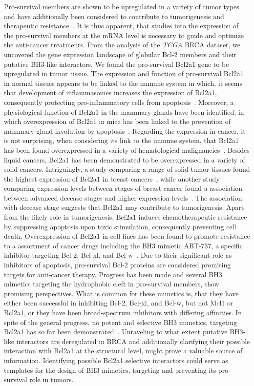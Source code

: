\documentclass[10pt,letterpaper]{article}
\begin{document}
Pro-survival members are shown to be upregulated in a variety of tumor types~\cite{Rochaix1999, Strik1999, 10.2307/1693640, Placzek2010} and have additionally been considered to contribute to tumorigenesis and therapeutic resistance~\cite{Bae2006, Adams2007, Kim2012}. It is thus apparent, that studies into the expression of the pro-survival members at the mRNA level is necessary to guide and optimize the anti-cancer treatments.
From the analysis of the \textit{TCGA} BRCA dataset, we uncovered the gene expression landscape of globular Bcl-2 members and their putative BH3-like interactors.
We found the pro-survival Bcl2a1 gene to be upregulated in tumor tissue. The expression and function of pro-survival Bcl2a1 in normal tissues appears to be linked to the immune system in which, it seems that development of inflammasomes increases the expression of Bcl2a1, consequently protecting pro-inflammatory cells from apoptosis~\cite{Karsan1996, Noble1999}. Moreover, a physiological function of Bcl2a1 in the mammary glands have been identified, in which overexpression of Bcl2a1 in mice has been linked to the prevention of mammary gland involution by apoptosis~\cite{Capuco2002}. 
Regarding the expression in cancer, it is not surprising, when considering its link to the immune system, that Bcl2a1 has been found overexpressed in a variety of hematological malignancies~\cite{Nagy2003}. Besides liquid cancers, Bcl2a1 has been demonstrated to be overexpressed in a variety of solid cancers. Intriguingly, a study comparing a range of solid tumor tissues found the highest expression of Bcl2a1 in breast cancers~\cite{Beverly2009}, while another study comparing expression levels between stages of breast cancer found a association between advanced decease stages and higher expression levels~\cite{Yoon2003}. The association with decease stage suggests that Bcl2a1 may contribute to tumorigenesis.
Apart from the likely role in tumorigenesis, Bcl2a1 induces chemotherapeutic resistance by suppressing apoptosis upon toxic stimulation, consequently preventing cell death. Overexpression of Bcl2a1 in cell lines has been found to promote resistance to a assortment of cancer drugs including the BH3 mimetic ABT-737, a specific inhibitor targeting Bcl-2, Bcl-xl, and Bcl-w~\cite{Yecies2010}.
Due to their significant role as inhibitors of apoptosis, pro-survival Bcl-2 proteins are considered promising targets for anti-cancer therapy. Progress has been made and several BH3 mimetics targeting the hydrophobic cleft in pro-survival members, show promising perspectives. What is common for these mimetics is, that they have either been successful in inhibiting Bcl-2, Bcl-xl, and Bcl-w, but not Mcl1 or Bcl2a1, or they have been broad-spectrum inhibitors with differing affinities. In spite of the general progress, no potent and selective BH3 mimetics, targeting Bcl2a1 has so far been demonstrated~\cite{Vogler2012, Garner2017}. 
Unraveling to what extent putative BH3-like interactors are deregulated in BRCA and additionally clarifying their possible interaction with Bcl2a1 at the structural level, might prove a valuable source of information. Identifying possible Bcl2a1 selective interactors could serve as templates for the design of BH3 mimetics, targeting and preventing its pro-survival role in tumors.
\end{document}
